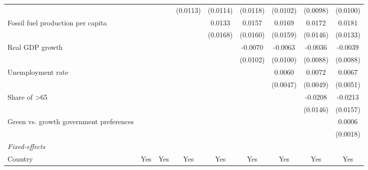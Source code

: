\begin{table}[htbp]
\begin{tabular}{lcccccccc}
                                                      &                 &                 & (0.0113) & (0.0114) & (0.0118)               & (0.0102)               & (0.0098) & (0.0100)\\   
      Fossil fuel production per capita               &                 &                 &          & 0.0133   & 0.0157                 & 0.0169                 & 0.0172   & 0.0181\\   
                                                      &                 &                 &          & (0.0168) & (0.0160)               & (0.0159)               & (0.0146) & (0.0133)\\   
      Real GDP growth                                 &                 &                 &          &          & -0.0070                & -0.0063                & -0.0036  & -0.0039\\   
                                                      &                 &                 &          &          & (0.0102)               & (0.0100)               & (0.0088) & (0.0088)\\   
      Unemployment rate                               &                 &                 &          &          &                        & 0.0060                 & 0.0072   & 0.0067\\   
                                                      &                 &                 &          &          &                        & (0.0047)               & (0.0049) & (0.0051)\\   
      Share of >65                                    &                 &                 &          &          &                        &                        & -0.0208  & -0.0213\\   
                                                      &                 &                 &          &          &                        &                        & (0.0146) & (0.0157)\\   
      Green vs. growth government preferences         &                 &                 &          &          &                        &                        &          & 0.0006\\   
                                                      &                 &                 &          &          &                        &                        &          & (0.0018)\\   
      \midrule
      \emph{Fixed-effects}\\
      Country                                         & Yes             & Yes             & Yes      & Yes      & Yes                    & Yes                    & Yes      & Yes\\  

\end{tabular}
\end{table}
